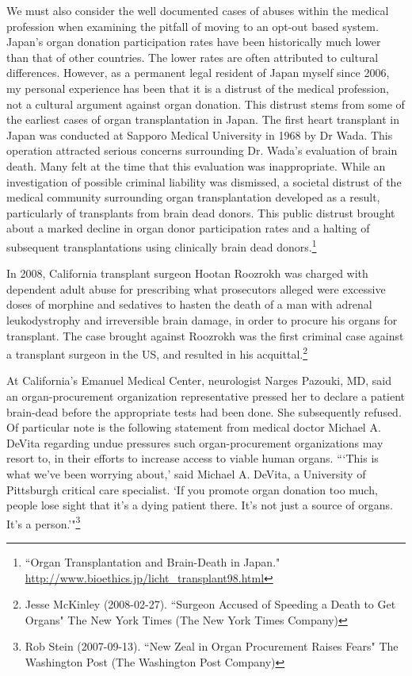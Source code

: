 \documentclass[letterpaper,10pt,twoside]{article}
\begin{document}
We must also consider the well documented cases of abuses within the medical profession when examining the pitfall of moving to an opt-out based system.  Japan's organ donation participation rates have been historically much lower than that of other countries.  The lower rates are often attributed to cultural differences.  However, as a permanent legal resident of Japan myself since 2006, my personal experience has been that it is a distrust of the medical profession, not a cultural argument against organ donation.  This distrust stems from some of the earliest cases of organ transplantation in Japan.  The first heart transplant in Japan was conducted at Sapporo Medical University in 1968 by Dr Wada.  This operation attracted serious concerns surrounding Dr. Wada's evaluation of brain death.  Many felt at the time that this evaluation was inappropriate. While an investigation of possible criminal liability was dismissed, a societal distrust of the medical community surrounding organ transplantation developed as a result, particularly of transplants from brain dead donors. This public distrust brought about a marked decline in organ donor participation rates and a halting of subsequent transplantations using clinically brain dead donors.\footnote{``Organ Transplantation and Brain-Death in Japan." \url{http://www.bioethics.jp/licht_transplant98.html}}

In 2008, California transplant surgeon Hootan Roozrokh was charged with dependent adult abuse for prescribing what prosecutors alleged were excessive doses of morphine and sedatives to hasten the death of a man with adrenal leukodystrophy and irreversible brain damage, in order to procure his organs for transplant. The case brought against Roozrokh was the first criminal case against a transplant surgeon in the US, and resulted in his acquittal.\footnote{Jesse McKinley (2008-02-27). ``Surgeon Accused of Speeding a Death to Get Organs" The New York Times (The New York Times Company)}

At California's Emanuel Medical Center, neurologist Narges Pazouki, MD, said an organ-procurement organization representative pressed her to declare a patient brain-dead before the appropriate tests had been done.  She subsequently refused.  Of particular note is the following statement from medical doctor Michael A. DeVita regarding undue pressures such organ-procurement organizations may resort to, in their efforts to increase access to viable human organs. ```This is what we've been worrying about,' said Michael A. DeVita, a University of Pittsburgh critical care specialist. `If you promote organ donation too much, people lose sight that it's a dying patient there. It's not just a source of organs. It's a person.'"\footnote{Rob Stein (2007-09-13). ``New Zeal in Organ Procurement Raises Fears" The Washington Post (The Washington Post Company)}
\end{document}
